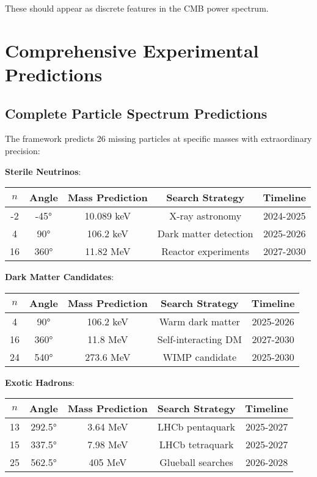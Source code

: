 \documentclass[12pt,a4paper]{article}
\begin{document}
These should appear as discrete features in the CMB power spectrum.

\section{Comprehensive Experimental Predictions}

\subsection{Complete Particle Spectrum Predictions}

The framework predicts 26 missing particles at specific masses with extraordinary precision:

\textbf{Sterile Neutrinos}:
\begin{center}
\begin{tabular}{@{}ccccc@{}}
\toprule
$n$ & Angle & Mass Prediction & Search Strategy & Timeline \\
\midrule
-2 & -45° & 10.089 keV & X-ray astronomy & 2024-2025 \\
4 & 90° & 106.2 keV & Dark matter detection & 2025-2026 \\
16 & 360° & 11.82 MeV & Reactor experiments & 2027-2030 \\
\bottomrule
\end{tabular}
\end{center}

\textbf{Dark Matter Candidates}:
\begin{center}
\begin{tabular}{@{}ccccc@{}}
\toprule
$n$ & Angle & Mass Prediction & Search Strategy & Timeline \\
\midrule
4 & 90° & 106.2 keV & Warm dark matter & 2025-2026 \\
16 & 360° & 11.8 MeV & Self-interacting DM & 2027-2030 \\
24 & 540° & 273.6 MeV & WIMP candidate & 2025-2030 \\
\bottomrule
\end{tabular}
\end{center}

\textbf{Exotic Hadrons}:
\begin{center}
\begin{tabular}{@{}ccccc@{}}
\toprule
$n$ & Angle & Mass Prediction & Search Strategy & Timeline \\
\midrule
13 & 292.5° & 3.64 MeV & LHCb pentaquark & 2025-2027 \\
15 & 337.5° & 7.98 MeV & LHCb tetraquark & 2025-2027 \\
25 & 562.5° & 405 MeV & Glueball searches & 2026-2028 \\
\bottomrule
\end{tabular}
\end{center}
\end{document}
